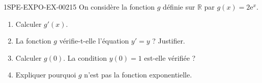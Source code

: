 \begin{exercice}{1SPE-EXPO-EX-002}{1}{5}
On considère la fonction $g$ définie sur $\mathbb{R}$ par $g(x) = 2\mathrm{e}^x$.
\begin{enumerate}
\item Calculer $g'(x)$.
\item La fonction $g$ vérifie-t-elle l'équation $y' = y$ ? Justifier.
\item Calculer $g(0)$. La condition $y(0) = 1$ est-elle vérifiée ?
\item Expliquer pourquoi $g$ n'est pas la fonction exponentielle.
\end{enumerate}
\end{exercice}
